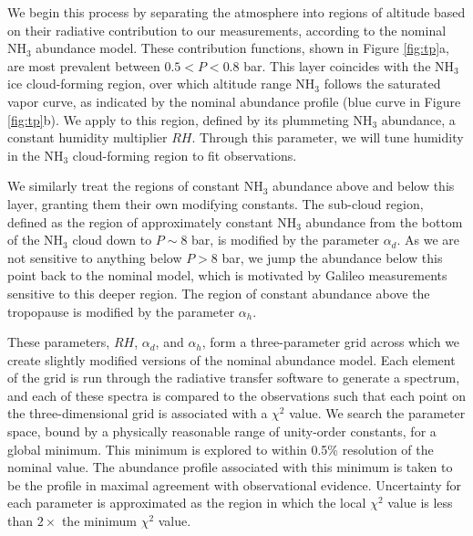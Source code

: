 \documentclass{article}
\begin{document}
	We begin this process by separating the atmosphere into regions of altitude based on their radiative contribution to our measurements, according to the nominal NH$_{3}$ abundance model.
	These contribution functions, shown in Figure \ref{fig:tp}a, are most prevalent between $0.5 < P < 0.8$ bar.
	This layer coincides with the NH$_{3}$ ice cloud-forming region, over which altitude range NH$_{3}$ follows the saturated vapor curve, as indicated by the nominal abundance profile (blue curve in Figure \ref{fig:tp}b).
	We apply to this region, defined by its plummeting NH$_{3}$ abundance, a constant humidity multiplier $RH$.
	Through this parameter, we will tune humidity in the NH$_{3}$ cloud-forming region to fit observations.

	We similarly treat the regions of constant NH$_{3}$ abundance above and below this layer, granting them their own modifying constants.
	The sub-cloud region, defined as the region of approximately constant NH$_{3}$ abundance from the bottom of the NH$_{3}$ cloud down to $P \sim 8$ bar, is modified by the parameter $\alpha_{d}$.
	As we are not sensitive to anything below $P > 8$ bar, we jump the abundance below this point back to the nominal model, which is motivated by Galileo measurements sensitive to this deeper region.
	The region of constant abundance above the tropopause is modified by the parameter $\alpha_{h}$.

	These parameters, $RH$, $\alpha_{d}$, and $\alpha_{h}$, form a three-parameter grid across which we create slightly modified versions of the nominal abundance model.
	Each element of the grid is run through the radiative transfer software to generate a spectrum, and each of these spectra is compared to the observations such that each point on the three-dimensional grid is associated with a $\chi^{2}$ value.
	We search the parameter space, bound by a physically reasonable range of unity-order constants, for a global minimum. This minimum is explored to within 0.5\% resolution of the nominal value.
	The abundance profile associated with this minimum is taken to be the profile in maximal agreement with observational evidence. Uncertainty for each parameter is approximated as the region in which the local $\chi^{2}$ value is less than $2\times$ the minimum $\chi^{2}$ value.
\end{document}
